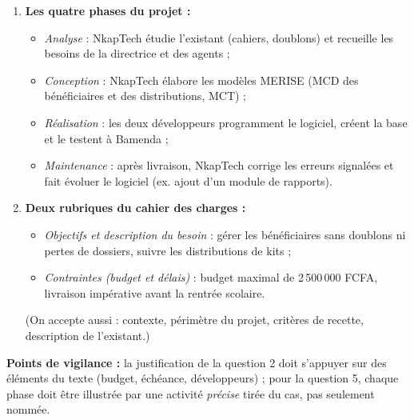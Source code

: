 \documentclass[11pt]{article}
\begin{document}
\begin{corrige}
\begin{enumerate}
\begin{itemize}
    \item \emph{Stockage} : conserver les dossiers des bénéficiaires dans la base de données, sans perte ni doublon ;
    \item \emph{Traitement} : rechercher automatiquement les doublons, compter les kits distribués par localité ;
    \item \emph{Diffusion/restitution} : éditer la liste des bénéficiaires d'une école pour la directrice ou les partenaires.
  \end{itemize}
  \item \textbf{Les quatre phases du projet :}
  \begin{itemize}
    \item \emph{Analyse} : NkapTech étudie l'existant (cahiers, doublons) et recueille les besoins de la directrice et des agents ;
    \item \emph{Conception} : NkapTech élabore les modèles MERISE (MCD des bénéficiaires et des distributions, MCT) ;
    \item \emph{Réalisation} : les deux développeurs programment le logiciel, créent la base et le testent à Bamenda ;
    \item \emph{Maintenance} : après livraison, NkapTech corrige les erreurs signalées et fait évoluer le logiciel (ex. ajout d'un module de rapports).
  \end{itemize}
  \item \textbf{Deux rubriques du cahier des charges :}
  \begin{itemize}
    \item \emph{Objectifs et description du besoin} : gérer les bénéficiaires sans doublons ni pertes de dossiers, suivre les distributions de kits ;
    \item \emph{Contraintes (budget et délais)} : budget maximal de 2\,500\,000 FCFA, livraison impérative avant la rentrée scolaire.
  \end{itemize}
  (On accepte aussi : contexte, périmètre du projet, critères de recette, description de l'existant.)
\end{enumerate}
\textbf{Points de vigilance :} la justification de la question 2 doit s'appuyer sur des éléments du texte (budget, échéance, développeurs) ; pour la question 5, chaque phase doit être illustrée par une activité \emph{précise} tirée du cas, pas seulement nommée.
\end{corrige}
\end{document}
